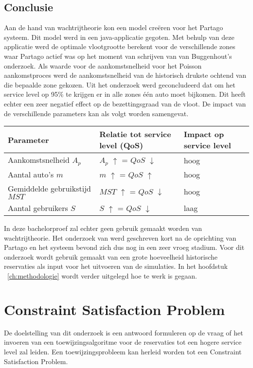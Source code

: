 \subsection{Conclusie}
Aan de hand van wachtrijtheorie kon \textcite{van-buggenhout} een model creëren voor het Partago systeem. Dit model werd in een java-applicatie gegoten. Met behulp van deze applicatie werd de optimale vlootgrootte berekent voor de verschillende zones waar Partago actief was op het moment van schrijven van van Buggenhout's onderzoek. Als waarde voor de aankomstsnelheid voor het Poisson aankomstproces werd de aankomstsnelheid van de historisch drukste ochtend van die bepaalde zone gekozen. Uit het onderzoek werd geconcludeerd dat om het service level op 95\% te krijgen er in alle zones één auto moet bijkomen. Dit heeft echter een zeer negatief effect op de bezettingsgraad van de vloot. De impact van de verschillende parameters kan als volgt worden samengevat. 
\begin{center}
	\begin{tabular}{ | l | l | p{3cm} |}
		\hline
		Parameter & Relatie tot service level (QoS) & Impact op service level \\ \hline
		Aankomstsnelheid $A_{p}$ & $A_{p}$ $\uparrow$ = $QoS$ $\downarrow$ & hoog \\ \hline
		Aantal auto's $m$ & $m$ $\uparrow$ = $QoS$ $\uparrow$ & hoog \\ \hline
		Gemiddelde gebruikstijd $MST$ & $MST$ $\uparrow$ = $QoS$ $\downarrow$ & hoog \\ \hline
		Aantal gebruikers $S$ & $S$ $\uparrow$ = $QoS$ $\downarrow$ & laag \\ \hline
	\end{tabular}
\end{center} 
In deze bachelorproef zal echter geen gebruik gemaakt worden van wachtrijtheorie. Het onderzoek van \textcite{van-buggenhout} werd geschreven kort na de oprichting van Partago en het systeem bevond zich dus nog in een zeer vroeg stadium. Voor dit onderzoek wordt gebruik gemaakt van een grote hoeveelheid historische reservaties als input voor het uitvoeren van de simulaties. In het hoofdstuk ~\ref{ch:methodologie} wordt verder uitgelegd hoe te werk is gegaan.

\section{Constraint Satisfaction Problem}

De doelstelling van dit onderzoek is een antwoord formuleren op de vraag of het invoeren van een toewijzingsalgoritme voor de reservaties tot een hogere service level zal leiden. Een toewijzingsprobleem kan herleid worden tot een Constraint Satisfaction Problem.

